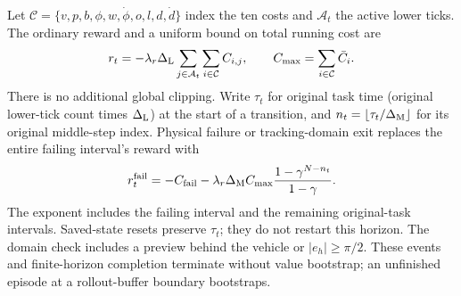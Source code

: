 Let $\mathcal C=\{v,p,b,\phi,w,\dot\phi,o,l,d,\dot d\}$ index the ten costs and $\mathcal A_t$ the active lower ticks. The ordinary reward and a uniform bound on total running cost are
\begin{equation}
 r_t=-\lambda_r\Delta_{\rm L}\sum_{j\in\mathcal A_t}\sum_{i\in\mathcal C}C_{i,j},
 \qquad C_{\max}=\sum_{i\in\mathcal C}\bar C_i.
\label{eq:reward}
\end{equation}
There is no additional global clipping. Write $\tau_t$ for original task time (original lower-tick count times $\Delta_{\rm L}$) at the start of a transition, and $n_t=\lfloor\tau_t/\Delta_{\rm M}\rfloor$ for its original middle-step index. Physical failure or tracking-domain exit replaces the entire failing interval's reward with
\begin{equation}
 r_t^{\rm fail}=-C_{\rm fail}-\lambda_r\Delta_{\rm M}C_{\max}
 \frac{1-\gamma^{N-n_t}}{1-\gamma}.
\label{eq:terminal}
\end{equation}
The exponent includes the failing interval and the remaining original-task intervals. Saved-state resets preserve $\tau_t$; they do not restart this horizon. The domain check includes a preview behind the vehicle or $|e_h|\ge\pi/2$. These events and finite-horizon completion terminate without value bootstrap; an unfinished episode at a rollout-buffer boundary bootstraps.

